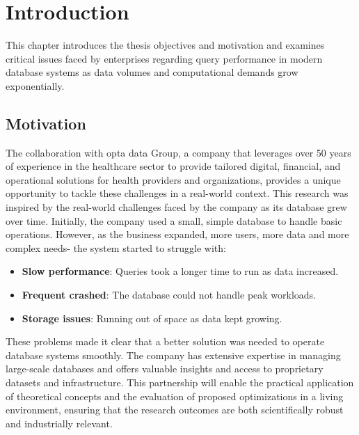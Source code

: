 \section{Introduction}
This chapter introduces the thesis objectives and motivation and examines critical issues faced by enterprises regarding query performance in modern database systems as data volumes and computational demands grow exponentially.
\subsection{Motivation}

The collaboration with opta data Group, a company that leverages over 50 years of experience in the healthcare sector to provide tailored digital, financial, and operational solutions for health providers and organizations, provides a unique opportunity to tackle these challenges in a real-world context. This research was inspired by the real-world challenges faced by the company as its database grew over time. Initially, the company used a small, simple database to handle basic operations. However, as the business expanded, more users, more data and more complex needs- the system started to struggle with:

\begin{itemize}
    \item \textbf{Slow performance}: Queries took a longer time to run as data increased.
    \item \textbf{Frequent crashed}: The database could not handle peak workloads.
    \item \textbf{Storage issues}: Running out of space as data kept growing.
\end{itemize}
These problems made it clear that a better solution was needed to operate database systems smoothly. The company has extensive expertise in managing large-scale databases and offers valuable insights and access to proprietary datasets and infrastructure. This partnership will enable the practical application of theoretical concepts and the evaluation of proposed optimizations in a living environment, ensuring that the research outcomes are both scientifically robust and industrially relevant. \vspace{.4cm}

